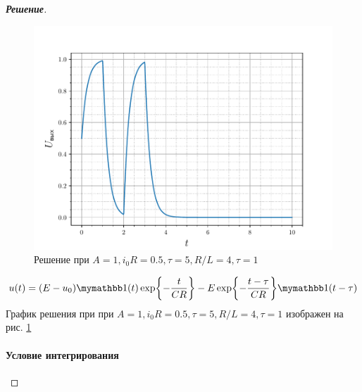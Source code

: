 \begin{proof}[\rm{\textbf{Решение}}]
\begin{figure}[h!]
	\centering
	\includegraphics[width=0.7\linewidth]{ris/task12_out}
	\caption{Решение при $A=1, i_0R=0.5, \tau=5, R/L=4, \tau=1$}
	\label{fig:12.2}
\end{figure}

\begin{equation}
	u(t)=(E-u_0)\H(t)\exp{-\frac{t}{CR}}-E \exp{-\frac{t- \tau	}{CR}}\H(t-\tau )
\end{equation} 
График решения при при $A=1, i_0R=0.5, \tau=5, R/L=4, \tau=1$ изображен на рис. \ref{fig:12.2}


\paragraph{Условие интегрирования} 





\end{proof}

